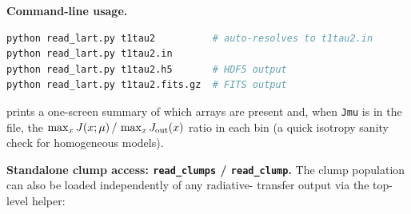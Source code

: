 \documentclass[english,a4paper]{my_memo}
\begin{document}
\smallskip\noindent\textbf{Command-line usage.}

\begin{lstlisting}[language=bash]
python read_lart.py t1tau2          # auto-resolves to t1tau2.in
python read_lart.py t1tau2.in
python read_lart.py t1tau2.h5       # HDF5 output
python read_lart.py t1tau2.fits.gz  # FITS output
\end{lstlisting}
\begin{sloppypar}
prints a one-screen summary of which arrays are present and, when
\texttt{Jmu} is in the file, the $\max_x J(x;\mu)\,/\,\max_x J_{\rm out}(x)$
ratio in each bin (a quick isotropy sanity check for
homogeneous models).
\end{sloppypar}

\smallskip\noindent\textbf{Standalone clump access:
\texttt{read\_clumps} / \texttt{read\_clump}.}
The clump population can also be loaded independently of any radiative-
transfer output via the top-level helper:
\end{document}
